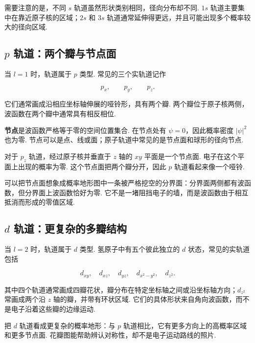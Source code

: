 \documentclass[UTF8,11pt,a4paper,openany]{ctexbook}
\newcommand{\term}[1]{\textbf{#1}}
\begin{document}
需要注意的是，不同 $s$ 轨道虽然形状类别相同，径向分布却不同. $1s$ 轨道主要集中在靠近原子核的区域；$2s$ 和 $3s$ 轨道通常延伸得更远，并且可能出现多个概率较大的径向区域. 

\subsection{$p$ 轨道：两个瓣与节点面}

当 $l=1$ 时，轨道属于 $p$ 类型. 常见的三个实轨道记作

\[
p_x,\qquad p_y,\qquad p_z.
\]

它们通常画成沿相应坐标轴伸展的哑铃形，具有两个瓣. 两个瓣位于原子核两侧，波函数在两个瓣中通常具有相反相位. 

\begin{definitionbox}
\term{节点}是波函数严格等于零的空间位置集合. 在节点处有 $\psi=0$，因此概率密度 $\left|\psi\right|^2$ 也为零. 节点可以是点、线或面；原子轨道中常见的是节点面和球形的径向节点. 
\end{definitionbox}

对于 $p_z$ 轨道，经过原子核并垂直于 $z$ 轴的 $xy$ 平面是一个节点面. 电子在这个平面上出现的概率为零. 这个节点面把两个瓣分开，因此 $p$ 轨道看起来像一个哑铃. 

\begin{analogybox}
可以把节点面想象成概率地形图中一条被严格挖空的分界面：分界面两侧都有波函数，但分界面上波函数恰好为零. 它不是一堵阻挡电子的墙，而是波函数由于相互抵消而形成的零值区域. 
\end{analogybox}

\subsection{$d$ 轨道：更复杂的多瓣结构}

当 $l=2$ 时，轨道属于 $d$ 类型. 氢原子中有五个彼此独立的 $d$ 状态，常见的实轨道包括

\[
d_{xy},\quad d_{xz},\quad d_{yz},\quad d_{x^2-y^2},\quad d_{z^2}.
\]

其中四个轨道通常画成四瓣花状，瓣分布在特定坐标轴之间或沿坐标轴方向；$d_{z^2}$ 常画成两个沿 $z$ 轴的瓣，并带有环状区域. 它们的具体形状来自角向波函数，而不是电子沿着这些瓣的边缘运动. 

\begin{analogybox}
把 $d$ 轨道看成更复杂的概率地形：与 $p$ 轨道相比，它有更多方向上的高概率区域和更多节点面. 花瓣图能帮助辨认对称性，却不是电子运动路线的照片. 
\end{analogybox}
\end{document}
